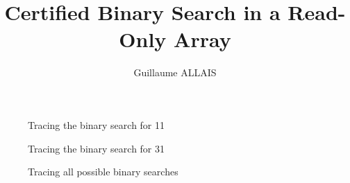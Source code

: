 \documentclass{article}
\title{Certified Binary Search in a Read-Only Array}
\author{Guillaume ALLAIS}
\begin{document}
\maketitle
\begin{figure}
  \center
  \caption{Tracing the binary search for 11}
\end{figure}

\begin{figure}
  \center
  \caption{Tracing the binary search for 31}
\end{figure}

\begin{figure}
  \center
  \caption{Tracing all possible binary searches}
\end{figure}
\end{document}
